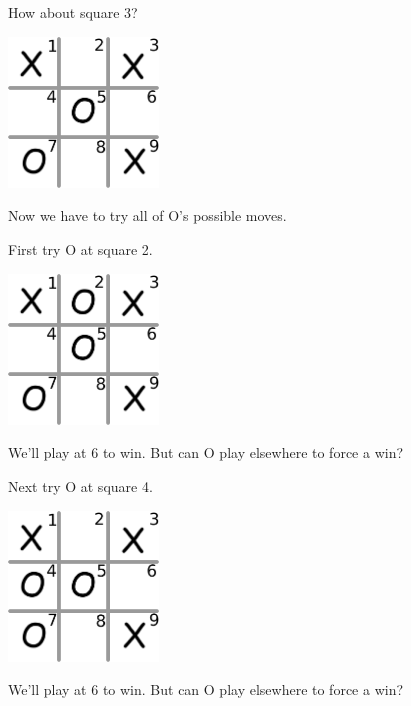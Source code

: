 \documentclass{beamer} %
\begin{document}
\begin{frame}
  How about square 3?
  \begin{center}
\includegraphics[width=0.3\textwidth]{assets/oxo-board7.pdf}
\end{center}
\end{frame}
\begin{frame}
  
    Now we have to try all of O's possible moves.

    First try O at square 2.
  \begin{center}
\includegraphics[width=0.3\textwidth]{assets/oxo-board8.pdf}
  \end{center}

  We'll play at 6 to win.  But can O play elsewhere to force a win?
\end{frame}
\begin{frame}
    Next try O at square 4.

    \begin{center}
\hspace{0.25in}\includegraphics[width=0.3\textwidth]{assets/oxo-board9.pdf}
\end{center}

    We'll play at 6 to win.  But can O play elsewhere to force a win?
\end{frame}
\end{document}
